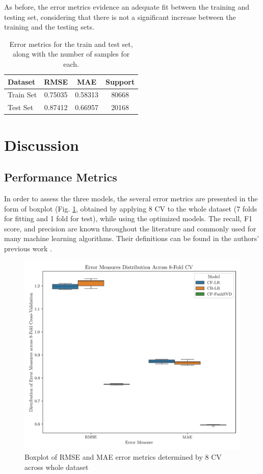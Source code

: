 \documentclass[conference]{IEEEtran}
\begin{document}
As before, the error metrics evidence an adequate fit between the training and testing set, considering that there is not a significant increase between the training and the testing sets.
\newline
\newline
\begin{table}[H]
\centering
\caption{Error metrics for the train and test set, along with the number of samples for each.}
\label{tab:model03_results}
\begin{tabular}{lccc}
\toprule
\textbf{Dataset} & \textbf{RMSE} & \textbf{MAE} & \textbf{Support} \\
\midrule
Train Set & 0.75035 & 0.58313 & 80668 \\
Test Set & 0.87412 & 0.66957 & 20168 \\
\bottomrule
\end{tabular}
\end{table}


\section{Discussion} 
\subsection{Performance Metrics} %

In order to assess the three models, the several error metrics are presented in the form of boxplot (Fig. \ref{fig:results_boxplot}, obtained by applying 8 CV to the whole dataset (7 folds for fitting and 1 fold for test), while using the optimized models. The recall, F1 score, and precision are known throughout the literature and commonly used for many machine learning algorithms. Their definitions can be found in the authors' previous work \cite{jpveris}.

\begin{figure}[H]
    \centering
    \includegraphics[width=1\linewidth]{assets/results_boxplot.png}
    \caption{Boxplot of RMSE and MAE error metrics determined by 8 CV across whole dataset}
    \label{fig:results_boxplot}
\end{figure}
\end{document}
